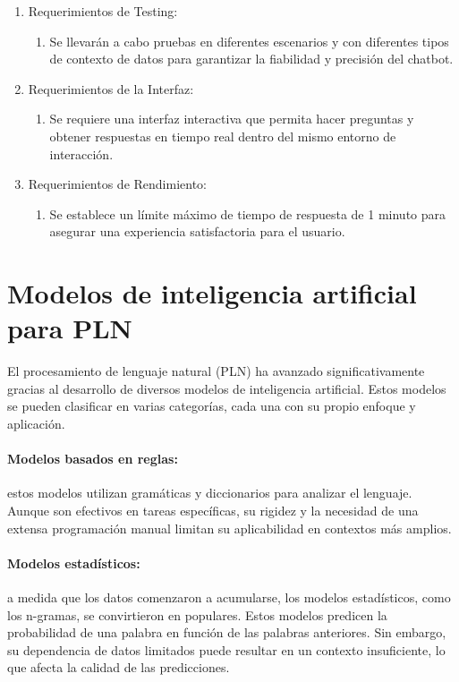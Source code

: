 \begin{enumerate}
	\newpage %
    \item Requerimientos de Testing:
        \begin{enumerate}
            \item Se llevarán a cabo pruebas en diferentes escenarios y con diferentes tipos de contexto de datos para garantizar la fiabilidad y precisión del chatbot.
         \end{enumerate}
    \item Requerimientos de la Interfaz:
        \begin{enumerate}
            \item Se requiere una interfaz interactiva que permita hacer preguntas y obtener respuestas en tiempo real dentro del mismo entorno de interacción.
        \end{enumerate}
    \item Requerimientos de Rendimiento:
        \begin{enumerate} 
            \item Se establece un límite máximo de tiempo de respuesta de 1 minuto para asegurar una experiencia satisfactoria para el usuario.
        \end{enumerate}
  \end{enumerate}


  \section{Modelos de inteligencia artificial para PLN}
  El procesamiento de lenguaje natural (PLN) ha avanzado significativamente gracias al desarrollo de diversos modelos de inteligencia artificial. Estos modelos se pueden clasificar en varias categorías, cada una con su propio enfoque y aplicación.
     
  \paragraph{Modelos basados en reglas:} estos modelos utilizan gramáticas y diccionarios para analizar el lenguaje. Aunque son efectivos en tareas específicas, su rigidez y la necesidad de una extensa programación manual limitan su aplicabilidad en contextos más amplios.
  
  \paragraph{Modelos estadísticos:} a medida que los datos comenzaron a acumularse, los modelos estadísticos, como los n-gramas, se convirtieron en populares. Estos modelos predicen la probabilidad de una palabra en función de las palabras anteriores. Sin embargo, su dependencia de datos limitados puede resultar en un contexto insuficiente, lo que afecta la calidad de las predicciones.
  
